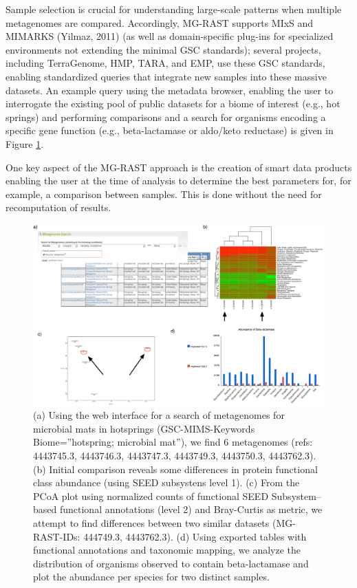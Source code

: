 \documentclass[12pt,fullpage]{report}
\begin{document}
Sample selection is crucial for understanding large-scale patterns when multiple metagenomes are compared. Accordingly, MG-RAST supports MIxS and MIMARKS (Yilmaz, 2011) (as well as domain-specific plug-ins for specialized environments not extending the minimal GSC standards); several projects, including TerraGenome, HMP, TARA, and EMP, use these GSC standards, enabling standardized queries that integrate new samples into these massive datasets. An example query using the metadata browser, enabling the user to interrogate the existing pool of public datasets for a biome of interest (e.g., hot springs) and performing comparisons and a search for organisms encoding a specific gene function (e.g., beta-lactamase or aldo/keto reductase) is given in
Figure \ref{fig:quad-chart-analysis-example}.

One key aspect of the MG-RAST approach is the creation of smart data products enabling the user at the time of analysis to determine the best parameters for, for example, a comparison between samples. This is done without the need for recomputation of results.


\begin{figure}
\begin{center}
\includegraphics[width=6in]{Images/quad-chart-analysis-example.png}
\end{center}
\caption{
(a) Using the web interface for a search of metagenomes for microbial mats in hotsprings (GSC-MIMS-Keywords Biome=”hotspring; microbial mat”), we find 6 metagenomes (refs: 4443745.3, 4443746.3, 4443747.3, 4443749.3, 4443750.3, 4443762.3). (b) Initial comparison reveals some differences in protein functional class abundance (using \gls{SEED} subsystens level 1). (c) From the PCoA plot using normalized counts of functional \gls{SEED} \gls{Subsystem}--based functional annotations (level 2) and Bray-Curtis as metric, we attempt to find differences between two similar datasets (MG-RAST-IDs: 444749.3, 4443762.3). (d) Using exported tables with functional annotations and taxonomic mapping, we analyze the distribution of organisms observed to contain beta-lactamase and plot the abundance per species for two distinct samples.
}
\label{fig:quad-chart-analysis-example}
\end{figure}
\end{document}
